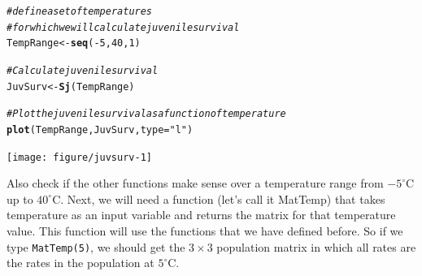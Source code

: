 \documentclass{article}\usepackage[]{graphicx}\usepackage[]{color}
\makeatletter
\newcommand{\hlnum}[1]{\textcolor[rgb]{0.686,0.059,0.569}{#1}}%
\newcommand{\hlstr}[1]{\textcolor[rgb]{0.192,0.494,0.8}{#1}}%
\newcommand{\hlcom}[1]{\textcolor[rgb]{0.678,0.584,0.686}{\textit{#1}}}%
\newcommand{\hlopt}[1]{\textcolor[rgb]{0,0,0}{#1}}%
\newcommand{\hlstd}[1]{\textcolor[rgb]{0.345,0.345,0.345}{#1}}%
\newcommand{\hlkwb}[1]{\textcolor[rgb]{0.69,0.353,0.396}{#1}}%
\newcommand{\hlkwc}[1]{\textcolor[rgb]{0.333,0.667,0.333}{#1}}%
\newcommand{\hlkwd}[1]{\textcolor[rgb]{0.737,0.353,0.396}{\textbf{#1}}}%
\newenvironment{kframe}{%
 \def\at@end@of@kframe{}%
 \ifinner\ifhmode%
  \def\at@end@of@kframe{\end{minipage}}%
  \begin{minipage}{\columnwidth}%
 \fi\fi%
 \def\FrameCommand##1{\hskip\@totalleftmargin \hskip-\fboxsep
 \colorbox{shadecolor}{##1}\hskip-\fboxsep
     \hskip-\linewidth \hskip-\@totalleftmargin \hskip\columnwidth}%
 \MakeFramed {\advance\hsize-\width
   \@totalleftmargin\z@ \linewidth\hsize
   \@setminipage}}%
 {\par\unskip\endMakeFramed%
 \at@end@of@kframe}
\newenvironment{knitrout}{}{} %
\makeatother
\begin{document}
\begin{knitrout}
\color{fgcolor}\begin{kframe}
\begin{alltt}
\hlcom{# define a set of temperatures}
\hlcom{# for which we will calculate juvenile survival}
\hlstd{TempRange} \hlkwb{<-} \hlkwd{seq}\hlstd{(}\hlopt{-}\hlnum{5}\hlstd{,}\hlnum{40}\hlstd{,}\hlnum{1}\hlstd{)}

\hlcom{# Calculate juvenile survival}
\hlstd{JuvSurv} \hlkwb{<-} \hlkwd{Sj}\hlstd{(TempRange)}

\hlcom{# Plot the juvenile survival as a function of temperature}
\hlkwd{plot}\hlstd{(TempRange,JuvSurv,}\hlkwc{type}\hlstd{=}\hlstr{"l"}\hlstd{)}
\end{alltt}
\end{kframe}
\texttt{[image: figure/juvsurv-1]} 

\end{knitrout}
Also check if the other functions make sense over a temperature range from $-5^{\circ}$C up to $40^{\circ}$C. Next, we will need a function (let's call it MatTemp) that takes temperature as an input variable and returns the matrix for that temperature value. This function will use the functions that we have defined before. So if we type \texttt{MatTemp(5)}, we should get the $3\times 3$ population matrix in which all rates are the rates in the population at $5^\circ$C.
\end{document}
